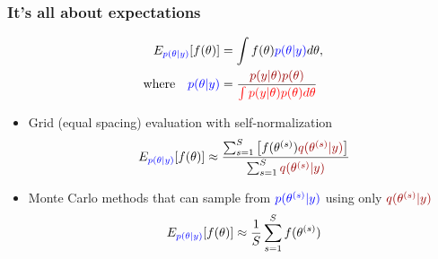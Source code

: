 \documentclass[10pt]{beamer}
\begin{document}
\begin{frame}

\frametitle{It's all about expectations}

  \vspace{-1.5\baselineskip}
   \begin{align*}
     E_{\color{blue} p(\theta|y)}[f(\theta)] & = \int f(\theta) {\color{blue} p(\theta|y)} d\theta,\\
     \text{where} \quad
     {\color{blue} p(\theta|y)} & = \frac{\color{uured}p(y|\theta)p(\theta)}{\color{red} \int p(y|\theta)p(\theta) d\theta}
   \end{align*}

 \begin{itemize}
   \vspace{-0.5\baselineskip}
    \item<4-> Grid (equal spacing) evaluation with self-normalization
      \begin{align*}
        E_{\color{blue} p(\theta|y)}[f(\theta)] \approx
        \frac{\sum_{s=1}^S \left[f(\theta^{(s)}){\color{uured}q(\theta^{(s)}|y)}\right]}{\sum_{s=1}^S{\color{uured}q(\theta^{(s)}|y)}}
      \end{align*}
    \item<5-> Monte Carlo methods that can sample from
      ${\color{blue}p(\theta^{(s)}|y)}$ using only
      ${\color{uured}q(\theta^{(s)}|y)}$
         \vspace{-0.5\baselineskip}
      \begin{align*}
        E_{\color{blue} p(\theta|y)}[f(\theta)] \approx \frac{1}{S} \sum_{s=1}^S f(\theta^{(s)})
      \end{align*}
    \end{itemize}

\end{frame}
\end{document}

